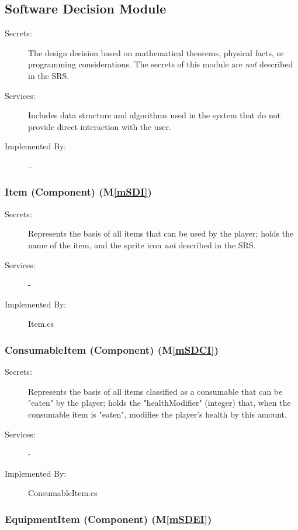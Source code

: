 \documentclass[12pt, titlepage]{article}
\newcommand{\mref}[1]{M\ref{#1}}
\begin{document}
\subsection{Software Decision Module}

\begin{description}
\item[Secrets:] The design decision based on mathematical theorems, physical
  facts, or programming considerations. The secrets of this module are
  \emph{not} described in the SRS.
\item[Services:] Includes data structure and algorithms used in the system that
  do not provide direct interaction with the user. 
\item[Implemented By:] --
\end{description}

\subsubsection{Item (Component) (\mref{mSDI})}

\begin{description}
\item[Secrets:] Represents the basis of all items that can be used by the player; holds the name of the item, and the sprite icon
  \emph{not} described in the SRS.
\item[Services:] -
\item[Implemented By:] Item.cs
\end{description}

\subsubsection{ConsumableItem (Component) (\mref{mSDCI})}

\begin{description}
\item[Secrets:] Represents the basis of all items classified as a consumable that can be "eaten" by the player; holds the "healthModifier" (integer) that, when the consumable item is "eaten", modifies the player's health by this amount.
\item[Services:] -
\item[Implemented By:] ConsumableItem.cs
\end{description}

\subsubsection{EquipmentItem (Component) (\mref{mSDEI})}
\end{document}
